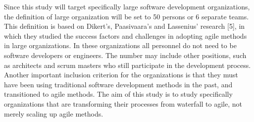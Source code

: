 Since this study will target specifically large software development
organizations, the definition of large organization will be set to 50
persons or 6 separate teams. This definition is based on Dikert's,
Paasivaara's and Lassenius' research [5], in which they studied the
success factors and challenges in adopting agile methods in large
organizations. In these organizations all personnel do not need to
be software developers or engineers. The number may include other
positions, such as architects and scrum masters who still participate
in the development process. Another important inclusion criterion for
the organizations is that they must have been using traditional software
development methods in the past, and transitioned to agile methods.
The aim of this study is to study specifically organizations that are
transforming their processes from waterfall to agile, not merely scaling
up agile methods.
